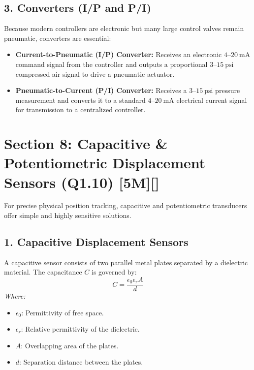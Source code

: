 \subsection{3. Converters (I/P and P/I)}
Because modern controllers are electronic but many large control valves remain pneumatic, converters are essential:
\begin{itemize}
  \item   \textbf{Current-to-Pneumatic (I/P) Converter:} Receives an electronic $4\text{--}20\ \text{mA}$ command signal from the controller and outputs a proportional $3\text{--}15\ \text{psi}$ compressed air signal to drive a pneumatic actuator.
  \item   \textbf{Pneumatic-to-Current (P/I) Converter:} Receives a $3\text{--}15\ \text{psi}$ pressure measurement and converts it to a standard $4\text{--}20\ \text{mA}$ electrical current signal for transmission to a centralized controller.
\end{itemize}


\section{Section 8: Capacitive \& Potentiometric Displacement Sensors (Q1.10) [5M][]}

For precise physical position tracking, capacitive and potentiometric transducers offer simple and highly sensitive solutions.

\subsection{1. Capacitive Displacement Sensors}
A capacitive sensor consists of two parallel metal plates separated by a dielectric material. The capacitance $C$ is governed by:
\[ C = \frac{\epsilon_0 \epsilon_r A}{d} \]
\textit{Where:}
\begin{itemize}
  \item   $\epsilon_0$: Permittivity of free space.
  \item   $\epsilon_r$: Relative permittivity of the dielectric.
  \item   $A$: Overlapping area of the plates.
  \item   $d$: Separation distance between the plates.
\end{itemize}

